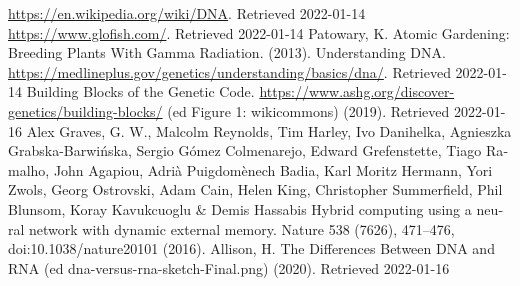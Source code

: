 \documentclass[12pt,a4paper,BCOR=.7cm,headsepline,bibliography=totoc]{report}
\begin{document}
\begin{thebibliography}{1}
\begin{latin}
 {\href{https://en.wikipedia.org/wiki/DNA}{\url{https://en.wikipedia.org/wiki/DNA}}. Retrieved 2022-01-14}
 {\href{https://www.glofish.com/}{\url{https://www.glofish.com/}}. Retrieved 2022-01-14}
 {Patowary, K. Atomic Gardening: Breeding Plants With Gamma Radiation.  (2013).}
 {Understanding DNA. \href{https://medlineplus.gov/genetics/understanding/basics/dna/}{\url{https://medlineplus.gov/genetics/understanding/basics/dna/}}. Retrieved 2022-01-14}
 {Building Blocks of the Genetic Code. \href{https://www.ashg.org/discover-genetics/building-blocks/}{\url{https://www.ashg.org/discover-genetics/building-blocks/}} (ed Figure 1: wikicommons) (2019). Retrieved 2022-01-16}
 {Alex Graves, G. W., Malcolm Reynolds, Tim Harley, Ivo Danihelka, Agnieszka Grabska-Barwińska, Sergio Gómez Colmenarejo, Edward Grefenstette, Tiago Ramalho, John Agapiou, Adrià Puigdomènech Badia, Karl Moritz Hermann, Yori Zwols, Georg Ostrovski, Adam Cain, Helen King, Christopher Summerfield, Phil Blunsom, Koray Kavukcuoglu \& Demis Hassabis Hybrid computing using a neural network with dynamic external memory. Nature 538 (7626), 471–476, doi:10.1038/nature20101 (2016).}
 {Allison, H. The Differences Between DNA and RNA (ed dna-versus-rna-sketch-Final.png) (2020). Retrieved 2022-01-16}

\end{latin}
\end{thebibliography}
\end{document}
